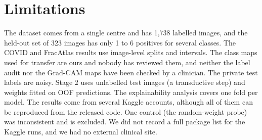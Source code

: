 \section{Limitations}
The dataset comes from a single centre and has 1,738 labelled images, and the held-out set of 323 images has only 1 to 6 positives for several classes. The COVID and FracAtlas results use image-level splits and intervals. The class maps used for transfer are ours and nobody has reviewed them, and neither the label audit nor the Grad-CAM maps have been checked by a clinician. The private test labels are noisy. Stage 2 uses unlabelled test images (a transductive step) and weights fitted on OOF predictions. The explainability analysis covers one fold per model. The results come from several Kaggle accounts, although all of them can be reproduced from the released code. One control (the random-weight probe) was inconsistent and is excluded. We did not record a full package list for the Kaggle runs, and we had no external clinical site.


